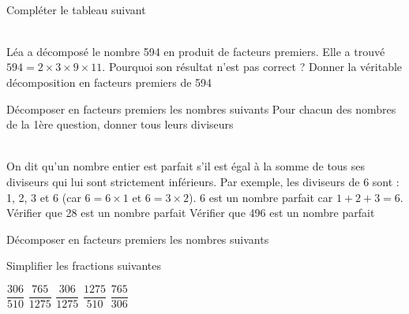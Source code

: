 \documentclass[../Cours.tex]{subfiles}
\begin{document}
\begin{questions}
    \exercice\\ Compléter le tableau suivant
    
    \begin{center}
    \end{center}
    
    \exercice\\ Léa a décomposé le nombre 594 en produit de facteurs premiers. Elle a trouvé $594 = 2 \times 3 \times 9 \times 11$.
    \question Pourquoi son résultat n'est pas correct ?
    \question Donner la véritable décomposition en facteurs premiers de 594

    \exercice 
        \question Décomposer en facteurs premiers les nombres suivants
        \question Pour chacun des nombres de la 1ère question, donner tous leurs diviseurs
        
    \exercice\\ On dit qu'un nombre entier est parfait s'il est égal à la somme de tous ses diviseurs qui lui sont strictement inférieurs. Par exemple, les diviseurs de 6 sont : 1, 2, 3 et 6 (car $6 = 6 \times 1$ et $6 = 3 \times 2$). 6 est un nombre parfait car $1+2+3 = 6$.
        \question Vérifier que 28 est un nombre parfait
        \question Vérifier que 496 est un nombre parfait
        
        
    \exercice
        \question Décomposer en facteurs premiers les nombres suivants
        \vspace{-2ex}
        \begin{multicols}{4}
        \end{multicols}
        \question Simplifier les fractions suivantes
        \vspace{-1ex}
        \begin{multicols}{5}
            \subpart $\dfrac{306}{510}$
            \subpart $\dfrac{765}{1275}$
            \subpart $\dfrac{306}{1275}$
            \subpart $\dfrac{1275}{510}$
            \subpart $\dfrac{765}{306}$
        \end{multicols}

\end{questions}
\end{document}
